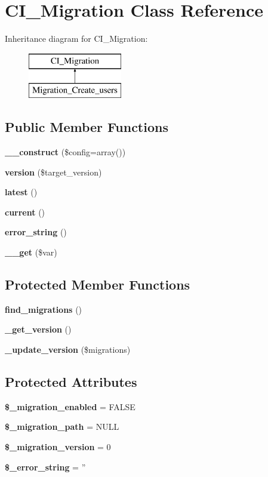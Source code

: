 \section{C\-I\-\_\-\-Migration Class Reference}
\label{class_c_i___migration}
Inheritance diagram for C\-I\-\_\-\-Migration\-:\begin{figure}[H]
\begin{center}
\leavevmode
\includegraphics[height=2.000000cm]{class_c_i___migration}
\end{center}
\end{figure}
\subsection*{Public Member Functions}
\begin{DoxyCompactItemize}
\item 
{\bf \-\_\-\-\_\-construct} (\$config=array())
\item 
{\bf version} (\$target\-\_\-version)
\item 
{\bf latest} ()
\item 
{\bf current} ()
\item 
{\bf error\-\_\-string} ()
\item 
{\bf \-\_\-\-\_\-get} (\$var)
\end{DoxyCompactItemize}
\subsection*{Protected Member Functions}
\begin{DoxyCompactItemize}
\item 
{\bf find\-\_\-migrations} ()
\item 
{\bf \-\_\-get\-\_\-version} ()
\item 
{\bf \-\_\-update\-\_\-version} (\$migrations)
\end{DoxyCompactItemize}
\subsection*{Protected Attributes}
\begin{DoxyCompactItemize}
\item 
{\bf \$\-\_\-migration\-\_\-enabled} = F\-A\-L\-S\-E
\item 
{\bf \$\-\_\-migration\-\_\-path} = N\-U\-L\-L
\item 
{\bf \$\-\_\-migration\-\_\-version} = 0
\item 
{\bf \$\-\_\-error\-\_\-string} = ''
\end{DoxyCompactItemize}


